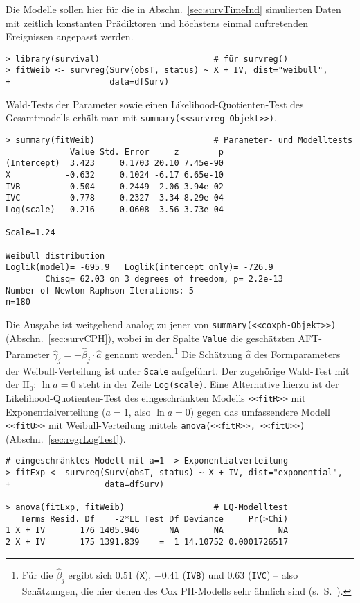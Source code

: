 Die Modelle sollen hier für die in Abschn.\ \ref{sec:survTimeInd} simulierten Daten mit zeitlich konstanten Prädiktoren und höchstens einmal auftretenden Ereignissen angepasst werden.
\begin{lstlisting}
> library(survival)                       # für survreg()
> fitWeib <- survreg(Surv(obsT, status) ~ X + IV, dist="weibull",
+                    data=dfSurv)
\end{lstlisting}

Wald-Tests der Parameter sowie einen Likelihood-Quotienten-Test des Gesamtmodells erhält man mit \lstinline!summary(<<survreg-Objekt>>)!.
\begin{lstlisting}
> summary(fitWeib)                        # Parameter- und Modelltests
             Value Std. Error     z        p
(Intercept)  3.423     0.1703 20.10 7.45e-90
X           -0.632     0.1024 -6.17 6.65e-10
IVB          0.504     0.2449  2.06 3.94e-02
IVC         -0.778     0.2327 -3.34 8.29e-04
Log(scale)   0.216     0.0608  3.56 3.73e-04

Scale=1.24

Weibull distribution
Loglik(model)= -695.9   Loglik(intercept only)= -726.9
        Chisq= 62.03 on 3 degrees of freedom, p= 2.2e-13
Number of Newton-Raphson Iterations: 5
n=180
\end{lstlisting}

Die Ausgabe ist weitgehend analog zu jener von \lstinline!summary(<<coxph-Objekt>>)! (Abschn.\ \ref{sec:survCPH}), wobei in der Spalte \lstinline!Value! die geschätzten AFT-Parameter $\hat{\gamma}_{j} = - \hat{\beta}_{j} \cdot \hat{a}$ genannt werden.\footnote{Für die $\hat{\beta}_{j}$ ergibt sich $0.51$ (\lstinline!X!), $-0.41$ (\lstinline!IVB!) und $0.63$ (\lstinline!IVC!) -- also Schätzungen, die hier denen des Cox PH-Modells sehr ähnlich sind (s.\ S.\ \pageref{sec:survCPHres}).} Die Schätzung $\hat{a}$ des Formparameters der Weibull-Verteilung ist unter \lstinline!Scale! aufgeführt. Der zugehörige Wald-Test mit der $\text{H}_{0}$: $\ln a = 0$ steht in der Zeile \lstinline!Log(scale)!. Eine Alternative hierzu ist der Likelihood-Quotienten-Test des eingeschränkten Modells \lstinline!<<fitR>>! mit Exponentialverteilung ($a = 1$, also $\ln a = 0$) gegen das umfassendere Modell \lstinline!<<fitU>>! mit Weibull-Verteilung mittels \lstinline!anova(<<fitR>>, <<fitU>>)! (Abschn.\ \ref{sec:regrLogTest}).
\begin{lstlisting}
# eingeschränktes Modell mit a=1 -> Exponentialverteilung
> fitExp <- survreg(Surv(obsT, status) ~ X + IV, dist="exponential",
+                   data=dfSurv)

> anova(fitExp, fitWeib)                  # LQ-Modelltest
   Terms Resid. Df    -2*LL Test Df Deviance     Pr(>Chi)
1 X + IV       176 1405.946      NA       NA           NA
2 X + IV       175 1391.839    =  1 14.10752 0.0001726517
\end{lstlisting}


